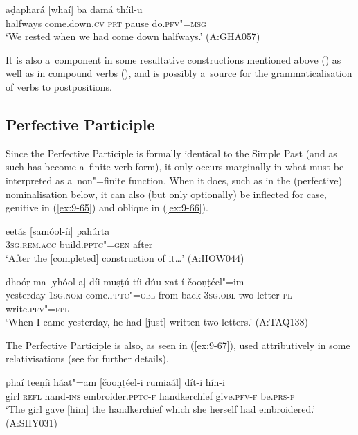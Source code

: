 \begin{exe}
\ex
\label{ex:9-64}
\gll aḍaphará [whaí] ba damá thíil-u \\
halfways come.down.\textsc{cv} \textsc{prt} pause do.\textsc{pfv"=msg} \\
\glt `We rested when we had come down halfways.' (A:GHA057)
\end{exe}

It is also a~component in some resultative constructions mentioned above () as well as in compound verbs (), and is possibly a~source for the grammaticalisation of verbs to postpositions.


\subsection{Perfective Participle}
\label{subsec:9-3-2}


Since the Perfective Participle is formally identical to the Simple Past (and as such has become a~finite verb form), it only occurs marginally in what must be interpreted as a~non"=finite function. When it does, such as in the (perfective) nominalisation below, it can also (but only optionally) be inflected for case, genitive in (\ref{ex:9-65}) and oblique in (\ref{ex:9-66}).

\begin{exe}
\ex
\label{ex:9-65}
\gll eetás [samóol-íi] pahúrta \\
\textsc{3sg.rem.acc} build.\textsc{pptc"=gen} after \\
\glt `After the [completed] construction of it{\ldots}' (A:HOW044)

\ex
\label{ex:9-66}
\gll dhoóṛ ma [yhóol-a] díi muṣṭú tíi dúu xat-í čooṇṭéel"=im\\
yesterday 1\textsc{sg.nom} come.\textsc{pptc"=obl} from back \textsc{3sg.obl} two letter-\textsc{pl} write.\textsc{pfv"=fpl}\\
\glt `When I came yesterday, he had [just] written two letters.' (A:TAQ138)
\end{exe}

The Perfective Participle is also, as seen in (\ref{ex:9-67}), used attributively in some relativisations (see  for further details).

\begin{exe}
\ex
\label{ex:9-67}
\gll phaí teeṇíi háat"=am [čooṇṭéel-i rumiaál] dít-i hín-i \\
girl \textsc{refl} hand-\textsc{ins} embroider.\textsc{pptc-f} handkerchief give.\textsc{pfv-f} be.\textsc{prs-f} \\
\glt `The girl gave [him] the handkerchief which she herself had embroidered.' (A:SHY031)
\end{exe}

